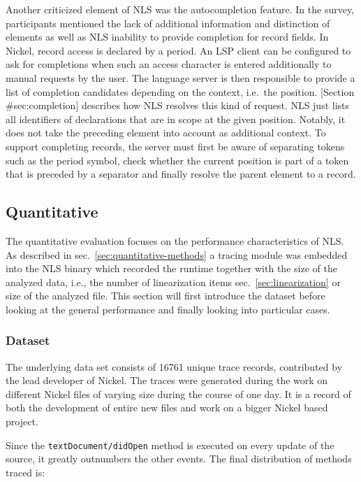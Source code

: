 \documentclass[
  a4paper,
  bibtex,
  english,
  nomenclature]{kthlatex/kththesis/kththesis}
\begin{document}
Another criticized element of NLS was the autocompletion feature. In the
survey, participants mentioned the lack of additional information and
distinction of elements as well as NLS inability to provide completion
for record fields. In Nickel, record access is declared by a period. An
LSP client can be configured to ask for completions when such an access
character is entered additionally to manual requests by the user. The
language server is then responsible to provide a list of completion
candidates depending on the context, i.e.~the position. {[}Section
\#sec:completion{]} describes how NLS resolves this kind of request. NLS
just lists all identifiers of declarations that are in scope at the
given position. Notably, it does not take the preceding element into
account as additional context. To support completing records, the server
must first be aware of separating tokens such as the period symbol,
check whether the current position is part of a token that is preceded
by a separator and finally resolve the parent element to a record.

\hypertarget{sec:quantitative}{%
\subsection{Quantitative}\label{sec:quantitative}}

The quantitative evaluation focuses on the performance characteristics
of NLS. As described in sec.~\ref{sec:quantitative-methods} a tracing
module was embedded into the NLS binary which recorded the runtime
together with the size of the analyzed data, i.e., the number of
linearization items sec.~\ref{sec:linearization} or size of the analyzed
file. This section will first introduce the dataset before looking at
the general performance and finally looking into particular cases.

\hypertarget{sec:dataset}{%
\subsubsection{Dataset}\label{sec:dataset}}

The underlying data set consists of 16761 unique trace records,
contributed by the lead developer of Nickel. The traces were generated
during the work on different Nickel files of varying size during the
course of one day. It is a record of both the development of entire new
files and work on a bigger Nickel based project.

Since the \texttt{textDocument/didOpen} method is executed on every
update of the source, it greatly outnumbers the other events. The final
distribution of methods traced is:
\end{document}
